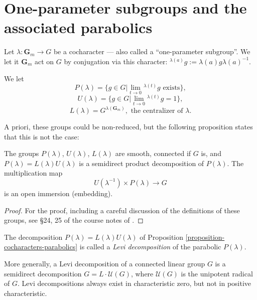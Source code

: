 \section{One-parameter subgroups and the associated parabolics}
\label{section-one-parameter}

Let $\lambda:\mathbf{G}_m \to G$ be a cocharacter --- also called a ``one-parameter subgroup''. We let it $\mathbf G_m$ act on $G$ by conjugation via this character: $^{\lambda(a)}g:= \lambda(a) g \lambda(a)^{-1}$.

We let 
$$P(\lambda)=\{g\in G| \lim_{t\to 0} {^{\lambda(t)}g} \mbox{ exists}\},$$  
$$U(\lambda)=\{g\in G| \lim_{t\to 0} {^{\lambda(t)}g} =1\},$$
$$L(\lambda)= G^{\lambda(\mathbf G_m)},\mbox{ the centralizer of }\lambda.$$

A priori, these groups could be non-reduced, but the following proposition states that this is not the case:

\begin{proposition}
 \label{proposition-cocharacters-parabolics}
The groups $P(\lambda)$, $U(\lambda)$, $L(\lambda)$ are smooth, connected if $G$ is, and $P(\lambda)=L(\lambda)U(\lambda)$ is a semidirect product decomposition of $P(\lambda)$. The multiplication map 
$$ U(\lambda^{-1})\times P(\lambda)\to G$$
is an open immersion (embedding).
\end{proposition}

\begin{proof}
 For the proof, including a careful discussion of the definitions of these groups, see \S 24, 25 of the course notes of \cite{Conrad-AG1}.
\end{proof}


\begin{definition}
 \label{definition-Levi-decomposition}
The decomposition $P(\lambda)=L(\lambda)U(\lambda)$ of Proposition \ref{proposition-cocharacters-parabolics} is called a \emph{Levi decomposition} of the parabolic $P(\lambda)$. 
\end{definition}

\begin{remark}
 \label{remark-general-Levi}
 More generally, a Levi decomposition of a connected linear group $G$ is a semidirect decomposition $G=L\cdot \mathcal U(G)$, where $\mathcal U(G)$ is the unipotent radical of $G$. Levi decompositions always exist in characteristic zero, but not in positive characteristic.
\end{remark}




